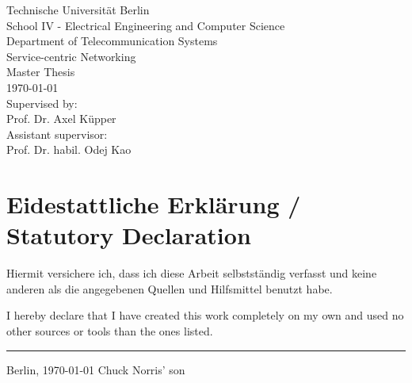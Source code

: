 \documentclass[twoside,11pt,titlepage,a4paper,english,bibliography=totocnumbered,listof=numbered]{scrbook}
\begin{document}
\begin{titlepage}
\begin{center}
		\vspace{0.5cm}
		Technische Universität Berlin\\
		School IV - Electrical Engineering and Computer Science\\
		Department of Telecommunication Systems\\
		Service-centric Networking\\
		\vspace{0.5cm}
		Master Thesis\\
		\vspace{2.2cm}
		\today\\
		\vspace{2.0cm}
		\large
		Supervised by:\\
		Prof. Dr. Axel Küpper\\
		\vspace{1cm}
		Assistant supervisor:\\
		Prof. Dr. habil. Odej Kao
		\end{center}
\end{titlepage}
\thispagestyle{empty}

\cleardoublepage

\newpage

\section*{\thispagestyle{empty}Eidestattliche Erklärung / Statutory Declaration}
Hiermit versichere ich, dass ich diese Arbeit selbst\-ständig verfasst und keine anderen als die angegebenen Quellen und Hilfsmittel benutzt habe.
\vspace{2em}

\noindent I hereby declare that I have created this work completely on my own and used no other sources or tools than the ones listed.

\vspace{30 mm}
\begin{flushright}

\rule{90mm}{1pt}

Berlin, \today \hspace{15 mm} Chuck Norris' son
\end{flushright}
\clearpage

\cleardoublepage{}

\newpage



\thispagestyle{empty}
\end{document}
